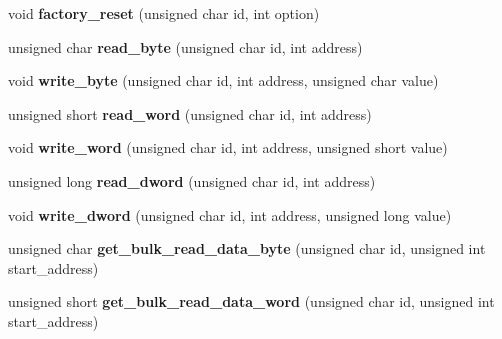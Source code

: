 \begin{DoxyCompactItemize}
\item 
\hypertarget{classdynamixel2_ab10d0f6f3c77e02dc028ba19ac55c609}{}void {\bfseries factory\+\_\+reset} (unsigned char id, int option)\label{classdynamixel2_ab10d0f6f3c77e02dc028ba19ac55c609}

\item 
\hypertarget{classdynamixel2_ae7641411f8eea1d9e14afceb303bc93c}{}unsigned char {\bfseries read\+\_\+byte} (unsigned char id, int address)\label{classdynamixel2_ae7641411f8eea1d9e14afceb303bc93c}

\item 
\hypertarget{classdynamixel2_ae511ba1af88cae4f3307d50242491011}{}void {\bfseries write\+\_\+byte} (unsigned char id, int address, unsigned char value)\label{classdynamixel2_ae511ba1af88cae4f3307d50242491011}

\item 
\hypertarget{classdynamixel2_a9b31ab524b63e309ce9f23fde56eb437}{}unsigned short {\bfseries read\+\_\+word} (unsigned char id, int address)\label{classdynamixel2_a9b31ab524b63e309ce9f23fde56eb437}

\item 
\hypertarget{classdynamixel2_aa74bdf1e52647d6b3d290b09eac32f1d}{}void {\bfseries write\+\_\+word} (unsigned char id, int address, unsigned short value)\label{classdynamixel2_aa74bdf1e52647d6b3d290b09eac32f1d}

\item 
\hypertarget{classdynamixel2_adb108e5166ba4beee4138e26ef16d1a4}{}unsigned long {\bfseries read\+\_\+dword} (unsigned char id, int address)\label{classdynamixel2_adb108e5166ba4beee4138e26ef16d1a4}

\item 
\hypertarget{classdynamixel2_a502f5c430f5370ab7f158204c5631ac7}{}void {\bfseries write\+\_\+dword} (unsigned char id, int address, unsigned long value)\label{classdynamixel2_a502f5c430f5370ab7f158204c5631ac7}

\item 
\hypertarget{classdynamixel2_a3d32eb232e64ceb94b007268da2c05a3}{}unsigned char {\bfseries get\+\_\+bulk\+\_\+read\+\_\+data\+\_\+byte} (unsigned char id, unsigned int start\+\_\+address)\label{classdynamixel2_a3d32eb232e64ceb94b007268da2c05a3}

\item 
\hypertarget{classdynamixel2_a5ba5fc3f030b88dd3dc889ab74724243}{}unsigned short {\bfseries get\+\_\+bulk\+\_\+read\+\_\+data\+\_\+word} (unsigned char id, unsigned int start\+\_\+address)\label{classdynamixel2_a5ba5fc3f030b88dd3dc889ab74724243}


\end{DoxyCompactItemize}
